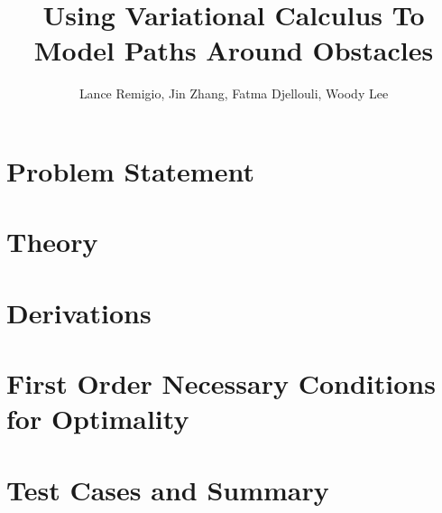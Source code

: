 \documentclass[a4paper]{report}
\title{Using Variational Calculus To Model Paths Around Obstacles}
\author{Lance Remigio, Jin Zhang, Fatma Djellouli, Woody Lee}
\begin{document}
\maketitle
\tableofcontents

\chapter{Problem Statement}



\chapter{Theory}



\chapter{Derivations}



\chapter{First Order Necessary Conditions for Optimality}



\chapter{Test Cases and Summary}




\end{document}
